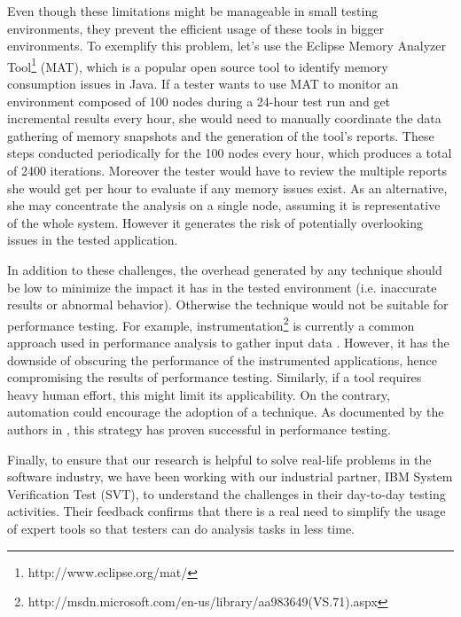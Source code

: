 \documentclass[runningheads,a4paper]{llncs}
\begin{document}
Even though these limitations might be manageable in small testing environments,
they prevent the efficient usage of these tools in bigger environments. To
exemplify this problem, let's use the Eclipse Memory Analyzer
Tool\footnote{http://www.eclipse.org/mat/} (MAT), which is a popular open source
tool to identify memory consumption issues in Java. If a tester wants to use MAT
to monitor an environment composed of 100 nodes during a 24-hour test run and 
get incremental results every hour, she would need to manually coordinate the
data gathering of memory snapshots and the generation of the tool's reports.
These steps conducted periodically for the 100 nodes every hour, which
produces a total of 2400 iterations. Moreover the tester would have to review
the multiple reports she would get per hour to evaluate if any memory issues
exist. As an alternative, she may concentrate the analysis on a single node,
assuming it is representative of the whole system. However it generates the risk of
potentially overlooking issues in the tested application.

In addition to these challenges, the overhead generated by any technique
should be low
to minimize the impact it has in the
tested environment (i.e. inaccurate results or abnormal behavior). Otherwise the
technique would not be suitable for performance testing. For example,
instrumentation\footnote{http://msdn.microsoft.com/en-us/library/aa983649(VS.71).aspx}
is currently a common approach used in performance analysis to gather input data
\cite{Yang1,Hangal1,Csallner1,Chen2}. However, it has the downside of obscuring
the performance of the instrumented applications, hence compromising the results of 
performance testing. 
Similarly, if a tool requires heavy human effort, this might limit its 
applicability. On the contrary, automation could encourage the adoption of a technique. As documented by the authors in \cite{Shahamiri1},
this strategy has proven successful in performance testing. %

Finally, to ensure that our research is helpful to solve real-life
problems in the software industry, we have been working with our industrial
partner, IBM System Verification Test (SVT), to understand the challenges
in their day-to-day testing activities. Their feedback confirms that there is a 
real need to simplify the usage of expert tools so that testers can do
analysis tasks in less time.
\end{document}
